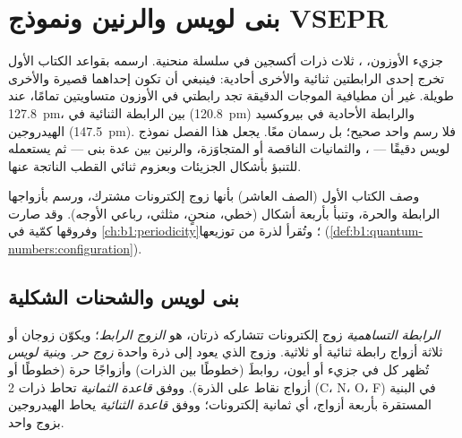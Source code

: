 \chapter{بنى لويس والرنين ونموذج VSEPR}\label{ch:b1:lewis-resonance-vsepr}

جزيء الأوزون، ، ثلاث ذرات أكسجين في سلسلة منحنية. ارسمه بقواعد
الكتاب الأول تخرج إحدى الرابطتين ثنائية والأخرى أحادية: فينبغي أن تكون
إحداهما قصيرة والأخرى طويلة. غير أن مطيافية الموجات الدقيقة تجد رابطتي
 في الأوزون متساويتين تمامًا، عند
\qty{127.8}{pm}، بين الرابطة الثنائية في  (\qty{120.8}{pm})
والرابطة الأحادية في بيروكسيد الهيدروجين (\qty{147.5}{pm}). فلا رسم واحد
صحيح؛ بل رسمان معًا. يجعل هذا الفصل نموذج لويس
دقيقًا --- ، والثمانيات الناقصة أو المتجاوَزة، والرنين
بين عدة بنى --- ثم يستعمله للتنبؤ بأشكال الجزيئات وبعزوم ثنائي القطب
الناتجة عنها.

\begin{recall}
وصف الكتاب الأول (الصف العاشر)  بأنها زوج إلكترونات
مشترك، ورسم  بأزواجها الرابطة والحرة، وتنبأ
بأربعة أشكال (خطي، منحنٍ، مثلثي، رباعي الأوجه). وقد صارت
 وفروقها كمّية في
\cref{ch:b1:periodicity}؛ وتُقرأ  لذرة من
توزيعها (\cref{def:b1:quantum-numbers:configuration}).
\end{recall}

\section{بنى لويس والشحنات الشكلية}

\begin{definition}\label{def:b1:lewis-resonance-vsepr:lewis}
\emph{الرابطة التساهمية} زوج إلكترونات تتشاركه
ذرتان، هو \emph{الزوج الرابط}؛ ويكوّن زوجان أو ثلاثة
أزواج رابطة ثنائية أو ثلاثية. وزوج  الذي
يعود إلى ذرة واحدة \emph{زوج حر}. و\emph{بنية
لويس} تُظهر كل 
في جزيء أو أيون، روابطَ (خطوطًا بين الذرات) وأزواجًا
حرة (خطوطًا أو أزواج نقاط على الذرة). ووفق \emph{قاعدة
الثمانية} تحاط ذرات  2 (C، N، O، F)
في البنية المستقرة بأربعة أزواج، أي ثمانية إلكترونات؛ ووفق
\emph{قاعدة الثنائية} يحاط الهيدروجين بزوج واحد.
\end{definition}

